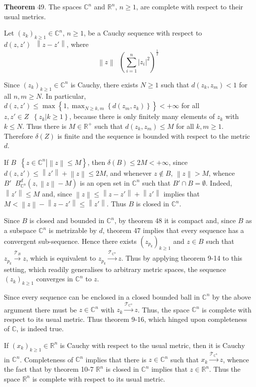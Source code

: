 \documentclass[a4paper]{article}
\newcommand{\obj}[1]{\left\{ #1 \right \}}
\newcommand{\brac}[1]{\left ( #1 \right )}
\newcommand{\induc}[1]{\left . #1 \right \vert}
\newcommand{\abs}[1]{\left | #1 \right |}
\newcommand{\nrm}[1]{\left\| #1 \right \|}
\newcommand{\Real}{\mathbb{R}}
\newcommand{\Cplx}{\mathbb{C}}
\newcommand{\Tcal}{\mathcal{T}}
\newcommand{\defn}{\mathop{\overset{\Delta}{=}}\nolimits}
\begin{document}
\label{thm:cplx_real_spaces_complete} \noindent \textbf{Theorem} 49.
The spaces $\Cplx^n$ and $\Real^n$, $n\geq 1$, are complete with respect to their usual metrics.

Let $\brac{z_k}_{k\geq 1} \in \Cplx^n$, $n\geq 1$, be a Cauchy sequence with respect to $d\brac{z,z'}\defn \nrm{z-z'}$, where \[\nrm{z}\defn \brac{ \sum_{i=1}^n \abs{z_i}^2 }^\frac{1}{2}\]

Since $\brac{z_k}_{k\geq 1}\in \Cplx^n$ is Cauchy, there exists $N\geq 1$ such that $d\brac{z_k,z_m} < 1$ for all $n,m\geq N$. In particular, $d\brac{z, z'}\leq \max\obj{1, \max_{N\geq k,m }\obj{d\brac{z_m, z_k} } }<+\infty$ for all $z,z'\in Z\defn \obj{\induc{z_k} k\geq 1}$, because there is only finitely many elements of $z_k$ with $k\leq N$. Thus there is $M\in \Real^+$ such that $d\brac{z_k, z_m}\leq M$ for all $k,m\geq 1$. Therefore $\delta\brac{Z}$ is finite and the sequence is bounded with respect to the metric $d$.

If $B\defn \obj{\induc{z\in \Cplx^n} \nrm{z}\leq M}$, then $\delta\brac{B}\leq 2M < +\infty$, since $d\brac{z,z'}\leq \nrm{z'} + \nrm{z}\leq 2M$, and whenever $z\notin B$, $\nrm{z}>M$, whence $B'\defn B_{\Cplx^n}^d\brac{z, \nrm{z}-M}$ is an open set in $\Cplx^n$ such that $B' \cap B = \emptyset$. Indeed, 
$\nrm{z'}\leq M$ and, since $\nrm{z}\leq \nrm{z-z'}+\nrm{z'}$ implies that $M < \nrm{z}-\nrm{z-z'}\leq \nrm{z'}$. Thus $B$ is closed in $\Cplx^n$.

Since $B$ is closed and bounded in $\Cplx^n$, by theorem 48 it is compact and, since $B$ as a subspace $\Cplx^n$ is metrizable by $d$, theorem 47 implies that every sequence has a convergent sub-sequence. Hence there exists $\brac{z_{p_k}}_{k\geq 1}$ and $z\in B$ such that $z_{p_k}\overset{\Tcal_B}{\to} z$, which is equivalent to $z_{p_k}\overset{\Tcal_{\Cplx^n}}{\to} z$. Thus by applying theorem 9-14 to this setting, which readily generalises to arbitrary metric spaces, the sequence $\brac{z_k}_{k\geq 1}$ converges in $\Cplx^n$ to $z$.

Since every sequence can be enclosed in a closed bounded ball in $\Cplx^n$ by the above argument there must be $z\in \Cplx^n$ with $z_k\overset{\Tcal_{\Cplx^n}}{\to} z$. Thus, the space $\Cplx^n$ is complete with respect to its usual metric. Thus theorem 9-16, which hinged upon completeness of $\Cplx$, is indeed true.

If $\brac{x_k}_{k\geq 1}\in \Real^n$ is Cauchy with respect to the usual metric, then it is Cauchy in $\Cplx^n$. Completeness of $\Cplx^n$ implies that there is $z\in \Cplx^n$ such that $x_k\overset{\Tcal_{\Cplx^n}}{\to} z$, whence the fact that by theorem 10-7 $\Real^n$ is closed in $\Cplx^n$ implies that $z\in \Real^n$. Thus the space $\Real^n$ is complete with respect to its usual metric.\\
\end{document}
